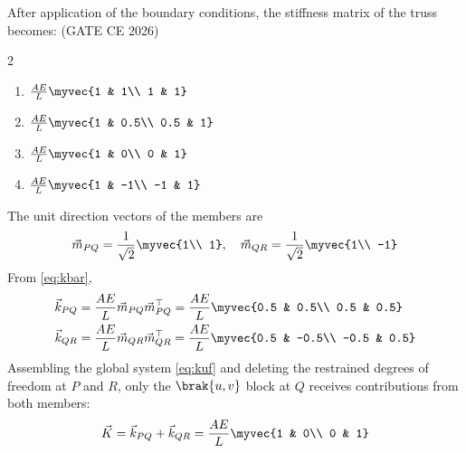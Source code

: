 \begin{enumerate}[label=\thesubsection.\arabic*, ref=\thesubsection.\theenumi, itemsep=0pt, leftmargin=*]
\begin{center}
\end{center}

After application of the boundary conditions, the stiffness matrix of the truss becomes: \hfill (GATE CE 2026)
\begin{multicols}{2}
\begin{enumerate}[label=\alph*), itemsep=0pt]
\item $\frac{AE}{L}\myvec{1 & 1\\ 1 & 1}$
\item $\frac{AE}{L}\myvec{1 & 0.5\\ 0.5 & 1}$
\item $\frac{AE}{L}\myvec{1 & 0\\ 0 & 1}$
\item $\frac{AE}{L}\myvec{1 & -1\\ -1 & 1}$
\end{enumerate}
\end{multicols}
\solution The unit direction vectors of the members are
\begin{align}
\vec{m}_{PQ} = \frac{1}{\sqrt{2}}\myvec{1\\ 1},\quad \vec{m}_{QR} = \frac{1}{\sqrt{2}}\myvec{1\\ -1}
\end{align}
From \eqref{eq:kbar},
\begin{align}
\vec{k}_{PQ} &= \frac{AE}{L}\vec{m}_{PQ}\vec{m}_{PQ}^\top = \frac{AE}{L}\myvec{0.5 & 0.5\\ 0.5 & 0.5}\\
\vec{k}_{QR} &= \frac{AE}{L}\vec{m}_{QR}\vec{m}_{QR}^\top = \frac{AE}{L}\myvec{0.5 & -0.5\\ -0.5 & 0.5}
\end{align}
Assembling the global system \eqref{eq:kuf} and deleting the restrained degrees of freedom at $P$ and $R$, only the $\brak{u,v}$ block at $Q$ receives contributions from both members:
\begin{align}
\vec{K} = \vec{k}_{PQ} + \vec{k}_{QR} = \frac{AE}{L}\myvec{1 & 0\\ 0 & 1}
\end{align}


\end{enumerate}

